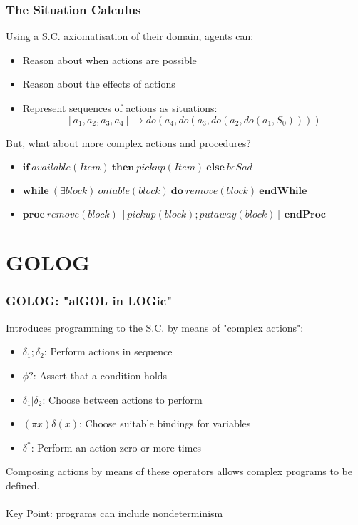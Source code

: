 \documentclass{beamer}
\begin{document}
\begin{frame}
\frametitle{The Situation Calculus}
Using a S.C. axiomatisation of their domain, agents can:
\begin{itemize}
  \item Reason about when actions are possible
  \item Reason about the effects of actions
  \item Represent sequences of actions as situations:\[
\left[a_1, a_2, a_3, a_4\right] \rightarrow do(a_4,do(a_3,do(a_2,do(a_1,S_0))))
\]
\end{itemize}
\pause
But, what about more complex actions and procedures?
\begin{itemize}
  \item $\mathbf{if}\ available(Item)\ \mathbf{then}\ pickup(Item)\ \mathbf{else}\ beSad$
  \item $\mathbf{while}\ (\exists block)\ ontable(block)\ \mathbf{do}\ remove(block)\ \mathbf{endWhile}$
  \item $\mathbf{proc}\ remove(block)\ [pickup(block);putaway(block)]\ \mathbf{endProc}$
\end{itemize}
\end{frame}

\section{GOLOG}
\begin{frame}
\frametitle{GOLOG: "alGOL in LOGic"}
Introduces programming to the S.C. by means of "complex actions":
\begin{itemize}
  \pause
  \item $\delta_1;\delta_2$: Perform actions in sequence
  \pause
  \item $\phi?$: Assert that a condition holds
  \pause
  \item $\delta_1|\delta_2$: Choose between actions to perform
  \pause
  \item $(\pi x)\delta(x)$: Choose suitable bindings for variables
  \pause
  \item $\delta^*$: Perform an action zero or more times
  \pause
\end{itemize}
Composing actions by means of these operators allows complex programs
to be defined.\\
\ \\
\pause
Key Point:  programs can include \alert{nondeterminism}
\end{frame}
\end{document}
